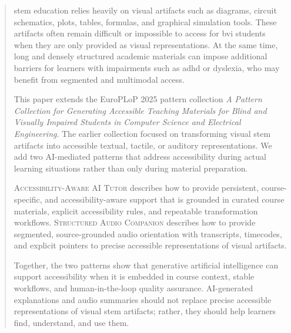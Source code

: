 \begin{abstract}
\ac{stem} education relies heavily on visual artifacts such as diagrams, circuit schematics, plots, tables, formulas, and graphical simulation tools. These artifacts often remain difficult or impossible to access for \ac{bvi} students when they are only provided as visual representations. At the same time, long and densely structured academic materials can impose additional barriers for learners with impairments such as \ac{adhd} or dyslexia, who may benefit from segmented and multimodal access.

This paper extends the EuroPLoP 2025 pattern collection \textit{A Pattern Collection for Generating Accessible Teaching Materials for Blind and Visually Impaired Students in Computer Science and Electrical Engineering}. The earlier collection focused on transforming visual \ac{stem} artifacts into accessible textual, tactile, or auditory representations. We add two AI-mediated patterns that address accessibility during actual learning situations rather than only during material preparation.

\textsc{Accessibility-Aware AI Tutor} describes how to provide persistent, course-specific, and accessibility-aware support that is grounded in curated course materials, explicit accessibility rules, and repeatable transformation workflows. \textsc{Structured Audio Companion} describes how to provide segmented, source-grounded audio orientation with transcripts, timecodes, and explicit pointers to precise accessible representations of visual artifacts.

Together, the two patterns show that generative artificial intelligence can support accessibility when it is embedded in course context, stable workflows, and human-in-the-loop quality assurance. AI-generated explanations and audio summaries should not replace precise accessible representations of visual \ac{stem} artifacts; rather, they should help learners find, understand, and use them.

\end{abstract}

